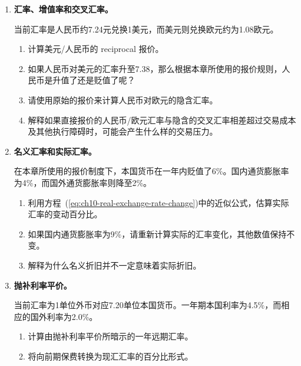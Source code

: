 \begin{enumerate}

\item \textbf{汇率、增值率和交叉汇率。}

当前汇率是人民币约7.24元兑换1美元，而美元则兑换欧元约为1.08欧元。

\begin{enumerate}

\item 计算美元/人民币的 reciprocal 报价。

\item 如果人民币对美元的汇率升至7.38，那么根据本章所使用的报价规则，人民币是升值了还是贬值了呢？

\item 请使用原始的报价来计算人民币对欧元的隐含汇率。

\item 解释如果直接报价的人民币/欧元汇率与隐含的交叉汇率相差超过交易成本及其他执行障碍时，可能会产生什么样的交易压力。

\end{enumerate}

\item \textbf{名义汇率和实际汇率。}

在本章所使用的报价制度下，本国货币在一年内贬值了6\%。国内通货膨胀率为4\%，而国外通货膨胀率则降至2\%。

\begin{enumerate}

\item 利用方程~(\ref{eq:ch10-real-exchange-rate-change})中的近似公式，估算实际汇率的变动百分比。

\item 如果国内通货膨胀率为9\%，请重新计算实际的汇率变化，其他数值保持不变。

\item 解释为什么名义折旧并不一定意味着实际折旧。

\end{enumerate}

\item \textbf{抛补利率平价。}

当前汇率为1单位外币对应7.20单位本国货币。一年期本国利率为4.5\%，而相应的国外利率为2.0\%。

\begin{enumerate}

\item 计算由抛补利率平价所暗示的一年远期汇率。

\item 将向前期保费转换为现汇汇率的百分比形式。


\end{enumerate}
\end{enumerate}
